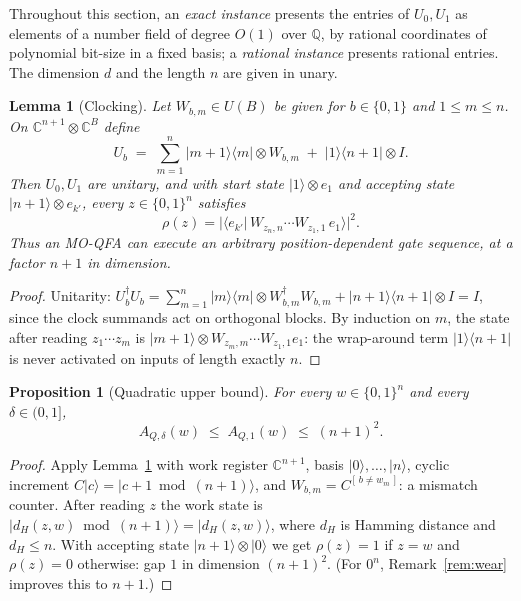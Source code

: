 \documentclass[11pt]{amsart}
\newtheorem{lemma}[theorem]{Lemma}
\newtheorem{proposition}[theorem]{Proposition}
\theoremstyle{definition}
\theoremstyle{remark}
\newcommand{\C}{\mathbb{C}}
\newcommand{\Q}{\mathbb{Q}}
\begin{document}
Throughout this section, an \emph{exact instance} presents the entries
of $U_0,U_1$ as elements of a number field of degree $O(1)$ over
$\Q$, by rational coordinates of polynomial bit-size in a fixed
basis; a \emph{rational instance} presents rational entries. The
dimension $d$ and the length $n$ are given in unary.

\begin{lemma}[Clocking]\label{lem:clock}
Let $W_{b,m}\in U(B)$ be given for $b\in\{0,1\}$ and $1\le m\le n$.
On $\C^{n+1}\otimes\C^B$ define
\[
  U_b \;=\; \sum_{m=1}^{n} |m{+}1\rangle\langle m| \otimes W_{b,m}
  \;+\; |1\rangle\langle n{+}1| \otimes I .
\]
Then $U_0,U_1$ are unitary, and with start state $|1\rangle\otimes
e_1$ and accepting state $|n{+}1\rangle\otimes e_{k'}$, every
$z\in\{0,1\}^n$ satisfies
\[
  \rho(z)=\bigl|\langle e_{k'}|\,W_{z_n,n}\cdots W_{z_1,1}\,
  e_1\rangle\bigr|^2 .
\]
Thus an MO-QFA can execute an arbitrary position-dependent gate
sequence, at a factor $n+1$ in dimension.
\end{lemma}

\begin{proof}
Unitarity: $U_b^\dagger U_b=\sum_{m=1}^n|m\rangle\langle m|\otimes
W_{b,m}^\dagger W_{b,m}+|n{+}1\rangle\langle n{+}1|\otimes I=I$, since
the clock summands act on orthogonal blocks. By induction on $m$, the
state after reading $z_1\cdots z_m$ is $|m{+}1\rangle\otimes
W_{z_m,m}\cdots W_{z_1,1}e_1$: the wrap-around term
$|1\rangle\langle n{+}1|$ is never activated on inputs of length
exactly $n$.
\end{proof}

\begin{proposition}[Quadratic upper bound]\label{prop:quadupper}
For every $w\in\{0,1\}^n$ and every $\delta\in(0,1]$,
\[
  A_{Q,\delta}(w)\;\le\;A_{Q,1}(w)\;\le\;(n+1)^2 .
\]
\end{proposition}

\begin{proof}
Apply Lemma~\ref{lem:clock} with work register $\C^{n+1}$, basis
$|0\rangle,\dots,|n\rangle$, cyclic increment
$C|c\rangle=|c+1\bmod (n{+}1)\rangle$, and
$W_{b,m}=C^{[\,b\ne w_m\,]}$: a mismatch counter. After reading $z$
the work state is $|d_H(z,w)\bmod(n{+}1)\rangle=|d_H(z,w)\rangle$,
where $d_H$ is Hamming distance and $d_H\le n$. With accepting state
$|n{+}1\rangle\otimes|0\rangle$ we get $\rho(z)=1$ if $z=w$ and
$\rho(z)=0$ otherwise: gap $1$ in dimension $(n+1)^2$. (For $0^n$,
Remark~\ref{rem:wear} improves this to $n+1$.)
\end{proof}
\end{document}
